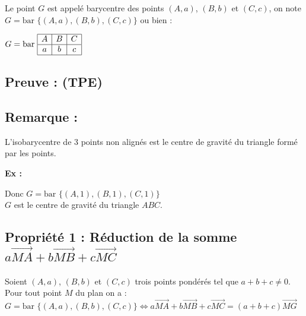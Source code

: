 \documentclass{article}
\begin{document}
\noindent Le point $G$ est appelé barycentre des points $(A, a)$, $(B, b)$ et $(C, c)$, on note $G = \text{bar } \{(A, a), (B, b), (C, c)\}$ ou bien :
\begin{center}
    $G = \text{bar } \begin{array}{|c|c|c|}
        \hline
        A & B & C \\
        \hline
        a & b & c \\
        \hline
    \end{array}$
\end{center}

\vspace{1em}

\subsection*{Preuve : (TPE)}

\subsection*{Remarque :}

\noindent L'isobarycentre de 3 points non alignés est le centre de gravité du triangle formé par les points.

\vspace{1em}

\noindent \textbf{Ex :} 

\vspace{1em}

\noindent Donc $G = \text{bar } \{(A, 1), (B, 1), (C, 1)\}$ \\
$G$ est le centre de gravité du triangle $ABC$.

\subsection*{Propriété 1 : Réduction de la somme $a\overrightarrow{MA} + b\overrightarrow{MB} + c\overrightarrow{MC}$}

\noindent Soient $(A, a)$, $(B, b)$ et $(C, c)$ trois points pondérés tel que $a + b + c \neq 0$. \\
Pour tout point $M$ du plan on a : \\
$G = \text{bar } \{(A, a), (B, b), (C, c)\} \iff a\overrightarrow{MA} + b\overrightarrow{MB} + c\overrightarrow{MC} = (a + b + c)\overrightarrow{MG}$

\vspace{1em}
\end{document}
